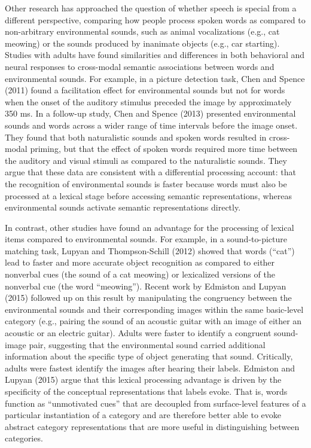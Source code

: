 \documentclass[english,floatsintext,man]{apa6}
\theoremstyle{definition}
\theoremstyle{definition}
\theoremstyle{definition}
\theoremstyle{remark}
\begin{document}
Other research has approached the question of whether speech is special
from a different perspective, comparing how people process spoken words
as compared to non-arbitrary environmental sounds, such as animal
vocalizations (e.g., cat meowing) or the sounds produced by inanimate
objects (e.g., car starting). Studies with adults have found
similarities and differences in both behavioral and neural responses to
cross-modal semantic associations between words and environmental
sounds. For example, in a picture detection task, Chen and Spence (2011)
found a facilitation effect for environmental sounds but not for words
when the onset of the auditory stimulus preceded the image by
approximately 350 ms. In a follow-up study, Chen and Spence (2013)
presented environmental sounds and words across a wider range of time
intervals before the image onset. They found that both naturalistic
sounds and spoken words resulted in cross-modal priming, but that the
effect of spoken words required more time between the auditory and
visual stimuli as compared to the naturalistic sounds. They argue that
these data are consistent with a differential processing account: that
the recognition of environmental sounds is faster because words must
also be processed at a lexical stage before accessing semantic
representations, whereas environmental sounds activate semantic
representations directly.

In contrast, other studies have found an advantage for the processing of
lexical items compared to environmental sounds. For example, in a
sound-to-picture matching task, Lupyan and Thompson-Schill (2012) showed
that words (\enquote{cat}) lead to faster and more accurate object
recognition as compared to either nonverbal cues (the sound of a cat
meowing) or lexicalized versions of the nonverbal cue (the word
\enquote{meowing}). Recent work by Edmiston and Lupyan (2015) followed
up on this result by manipulating the congruency between the
environmental sounds and their corresponding images within the same
basic-level category (e.g., pairing the sound of an acoustic guitar with
an image of either an acoustic or an electric guitar). Adults were
faster to identify a congruent sound-image pair, suggesting that the
environmental sound carried additional information about the specific
type of object generating that sound. Critically, adults were fastest
identify the images after hearing their labels. Edmiston and Lupyan
(2015) argue that this lexical processing advantage is driven by the
specificity of the conceptual representations that labels evoke. That
is, words function as \enquote{unmotivated cues} that are decoupled from
surface-level features of a particular instantiation of a category and
are therefore better able to evoke abstract category representations
that are more useful in distinguishing between categories.
\end{document}
